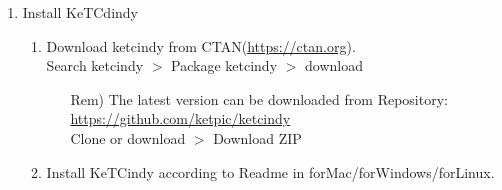 \documentclass{article}
\begin{document}
\begin{enumerate}[\bf\large 1.]
\item Install KeTCdindy
  \begin{enumerate}[(1)]
  \item Download ketcindy from CTAN(\url{https://ctan.org}).\\
  \hspace*{10mm}Search ketcindy $>$ Pack­age ketcindy $>$ download
    \begin{itemize}
    \item[Rem)]The latest version can be downloaded from Repository:\\
        \hspace*{5mm}\url{https://github.com/ketpic/ketcindy}\\
        \hspace*{10mm}Clone or download $>$ Download ZIP
    \end{itemize}
  \item Install KeTCindy according to Readme in forMac/forWindows/forLinux.
  \end{enumerate}
\end{enumerate}
\end{document}
